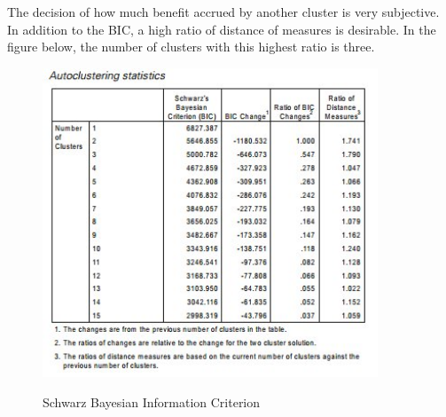 \documentclass[a4paper,12pt]{article}
\begin{document}
The decision of how much benefit accrued by another cluster is very subjective. In addition to the BIC, a high ratio of distance of measures is desirable. In the figure below, the number of clusters with this highest ratio is three.

\begin{figure}[h!]
	\begin{centering}
		\includegraphics[width=10cm]{TwoStep1.jpg}\\
		\caption{Schwarz Bayesian Information Criterion}
	\end{centering}
\end{figure}
\end{document}
